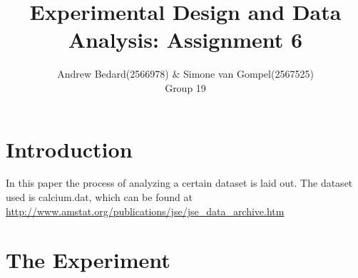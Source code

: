 \documentclass{article}
\title{Experimental Design and Data Analysis: Assignment 6}
\author{Andrew Bedard(2566978) \& Simone van Gompel(2567525) \\ Group 19}
\begin{document}
  \maketitle

  \section{Introduction}
    In this paper the process of analyzing a certain dataset is laid out.
    The dataset used is calcium.dat, which can be found at \url{http://www.amstat.org/publications/jse/jse_data_archive.htm}

  \section{The Experiment}
\end{document}
